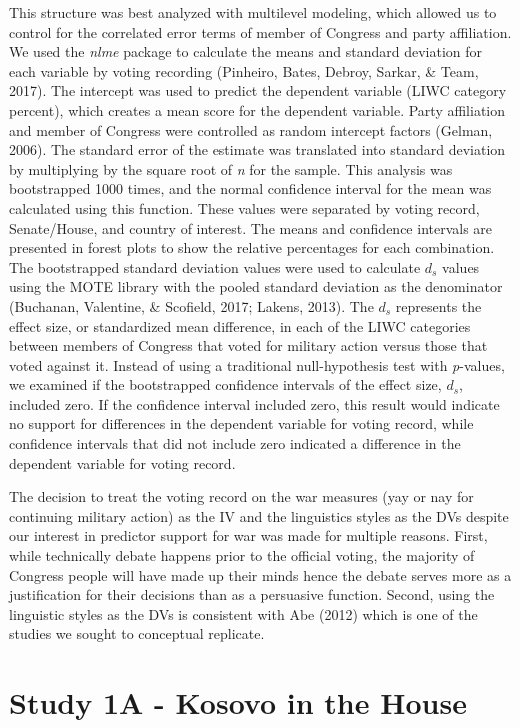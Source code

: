 \documentclass[english,,man]{apa6}
\begin{document}
This structure was best analyzed with multilevel modeling, which allowed us to control for the correlated error terms of member of Congress and party affiliation. We used the \emph{nlme} package to calculate the means and standard deviation for each variable by voting recording (Pinheiro, Bates, Debroy, Sarkar, \& Team, 2017). The intercept was used to predict the dependent variable (LIWC category percent), which creates a mean score for the dependent variable. Party affiliation and member of Congress were controlled as random intercept factors (Gelman, 2006). The standard error of the estimate was translated into standard deviation by multiplying by the square root of \emph{n} for the sample. This analysis was bootstrapped 1000 times, and the normal confidence interval for the mean was calculated using this function. These values were separated by voting record, Senate/House, and country of interest. The means and confidence intervals are presented in forest plots to show the relative percentages for each combination. The bootstrapped standard deviation values were used to calculate \(d_s\) values using the MOTE library with the pooled standard deviation as the denominator (Buchanan, Valentine, \& Scofield, 2017; Lakens, 2013). The \(d_s\) represents the effect size, or standardized mean difference, in each of the LIWC categories between members of Congress that voted for military action versus those that voted against it. Instead of using a traditional null-hypothesis test with \emph{p}-values, we examined if the bootstrapped confidence intervals of the effect size, \(d_s\), included zero. If the confidence interval included zero, this result would indicate no support for differences in the dependent variable for voting record, while confidence intervals that did not include zero indicated a difference in the dependent variable for voting record.

The decision to treat the voting record on the war measures (yay or nay for continuing military action) as the IV and the linguistics styles as the DVs despite our interest in predictor support for war was made for multiple reasons. First, while technically debate happens prior to the official voting, the majority of Congress people will have made up their minds hence the debate serves more as a justification for their decisions than as a persuasive function. Second, using the linguistic styles as the DVs is consistent with Abe (2012) which is one of the studies we sought to conceptual replicate.

\hypertarget{study-1a---kosovo-in-the-house}{%
\section{Study 1A - Kosovo in the House}\label{study-1a---kosovo-in-the-house}}
\end{document}
